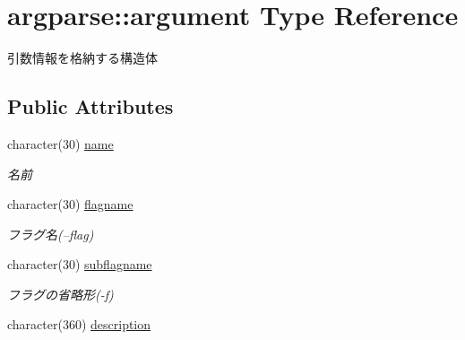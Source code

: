 \hypertarget{structargparse_1_1argument}{\section{argparse\-:\-:argument Type Reference}
\label{structargparse_1_1argument}
}


引数情報を格納する構造体  


\subsection*{Public Attributes}
\begin{DoxyCompactItemize}
\item 
\hypertarget{structargparse_1_1argument_addfd7d43f0c1edc84e3dc6b9ad77de45}{character(30) \hyperlink{structargparse_1_1argument_addfd7d43f0c1edc84e3dc6b9ad77de45}{name}}\label{structargparse_1_1argument_addfd7d43f0c1edc84e3dc6b9ad77de45}

\begin{DoxyCompactList}\small\item\em 名前 \end{DoxyCompactList}\item 
\hypertarget{structargparse_1_1argument_af1ca10abc83d0af45b13012bc2b59b91}{character(30) \hyperlink{structargparse_1_1argument_af1ca10abc83d0af45b13012bc2b59b91}{flagname}}\label{structargparse_1_1argument_af1ca10abc83d0af45b13012bc2b59b91}

\begin{DoxyCompactList}\small\item\em フラグ名(--flag) \end{DoxyCompactList}\item 
\hypertarget{structargparse_1_1argument_a6675eb0d21aa304f2ef7898cee6b873c}{character(30) \hyperlink{structargparse_1_1argument_a6675eb0d21aa304f2ef7898cee6b873c}{subflagname}}\label{structargparse_1_1argument_a6675eb0d21aa304f2ef7898cee6b873c}

\begin{DoxyCompactList}\small\item\em フラグの省略形(-\/f) \end{DoxyCompactList}\item 
\hypertarget{structargparse_1_1argument_aac3cc7003bd9525fa73fede684614db9}{character(360) \hyperlink{structargparse_1_1argument_aac3cc7003bd9525fa73fede684614db9}{description}}\label{structargparse_1_1argument_aac3cc7003bd9525fa73fede684614db9}


\end{DoxyCompactItemize}
